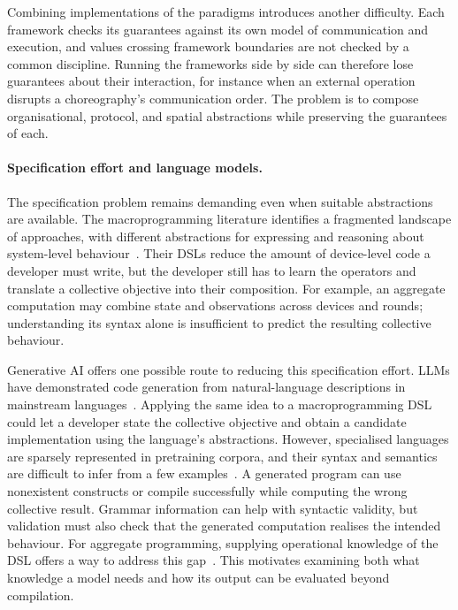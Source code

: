 Combining implementations of the paradigms introduces another difficulty.
Each framework checks its guarantees against its own model of communication and execution,
and values crossing framework boundaries are not checked by a common discipline.
%
Running the frameworks side by side can therefore lose guarantees about their interaction,
for instance when an external operation disrupts a choreography's communication order.
The problem is to compose organisational, protocol, and spatial abstractions while preserving the guarantees of each.

\paragraph{Specification effort and language models.}
The specification problem remains demanding even when suitable abstractions are available.
The macroprogramming literature identifies a fragmented landscape of approaches,
with different abstractions for expressing and reasoning about system-level behaviour~\cite{DBLP:journals/csur/Casadei23}.
%
Their \acp{DSL} reduce the amount of device-level code a developer must write,
but the developer still has to learn the operators and translate a collective objective into their composition.
For example, an aggregate computation may combine state and observations across devices and rounds;
understanding its syntax alone is insufficient to predict the resulting collective behaviour.

Generative AI offers one possible route to reducing this specification effort.
\Acp{LLM} have demonstrated code generation from natural-language descriptions in mainstream languages~\cite{DBLP:journals/corr/abs-2107-03374}.
Applying the same idea to a macroprogramming \ac{DSL} could let a developer state the collective objective
and obtain a candidate implementation using the language's abstractions.
%
However, specialised languages are sparsely represented in pretraining corpora,
and their syntax and semantics are difficult to infer from a few examples~\cite{DBLP:conf/nips/WangW0CSK23}.
%
A generated program can use nonexistent constructs or compile successfully while computing the wrong collective result.
Grammar information can help with syntactic validity,
but validation must also check that the generated computation realises the intended behaviour.
%
For aggregate programming, supplying operational knowledge of the \ac{DSL} offers a way to address this gap~\cite{DBLP:journals/tiot/AguzziFV25}.
This motivates examining both what knowledge a model needs and how its output can be evaluated beyond compilation.


